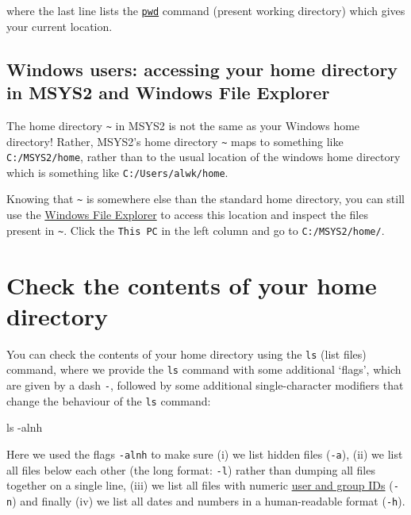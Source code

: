 \documentclass[
]{book}
\newenvironment{Shaded}{\begin{snugshade}}{\end{snugshade}}
\newcommand{\AttributeTok}[1]{\textcolor[rgb]{0.77,0.63,0.00}{#1}}
\newcommand{\FunctionTok}[1]{\textcolor[rgb]{0.00,0.00,0.00}{#1}}
\begin{document}
where the last line lists the \href{https://phoenixnap.com/kb/pwd-linux}{\texttt{pwd}} command (present working directory) which gives your current location.

\hypertarget{section:windowsfileexplorer}{%
\subsection{Windows users: accessing your home directory in MSYS2 and Windows File Explorer}\label{section:windowsfileexplorer}}

The home directory \texttt{\textasciitilde{}} in MSYS2 is not the same as your Windows home directory! Rather, MSYS2's home directory \texttt{\textasciitilde{}} maps to something like \texttt{C:/MSYS2/home}, rather than to the usual location of the windows home directory which is something like \texttt{C:/Users/alwk/home}.

Knowing that \texttt{\textasciitilde{}} is somewhere else than the standard home directory, you can still use the \href{https://support.microsoft.com/en-us/windows/find-and-open-file-explorer-ef370130-1cca-9dc5-e0df-2f7416fe1cb1\#WindowsVersion=Windows_10}{Windows File Explorer} to access this location and inspect the files present in \texttt{\textasciitilde{}}. Click the \texttt{This\ PC} in the left column and go to \texttt{C:/MSYS2/home/}.

\hypertarget{check-the-contents-of-your-home-directory}{%
\section{Check the contents of your home directory}\label{check-the-contents-of-your-home-directory}}

You can check the contents of your home directory using the \texttt{ls} (list files) command, where we provide the \texttt{ls} command with some additional `flags', which are given by a dash \texttt{-}, followed by some additional single-character modifiers that change the behaviour of the \texttt{ls} command:

\begin{Shaded}
\begin{Highlighting}[]
\FunctionTok{ls} \AttributeTok{{-}alnh}
\end{Highlighting}
\end{Shaded}

Here we used the flags \texttt{-alnh} to make sure (i) we list hidden files (\texttt{-a}), (ii) we list all files below each other (the long format: \texttt{-l}) rather than dumping all files together on a single line, (iii) we list all files with numeric \href{https://en.wikipedia.org/wiki/User_identifier}{user and group IDs} (\texttt{-n}) and finally (iv) we list all dates and numbers in a human-readable format (\texttt{-h}).
\end{document}
